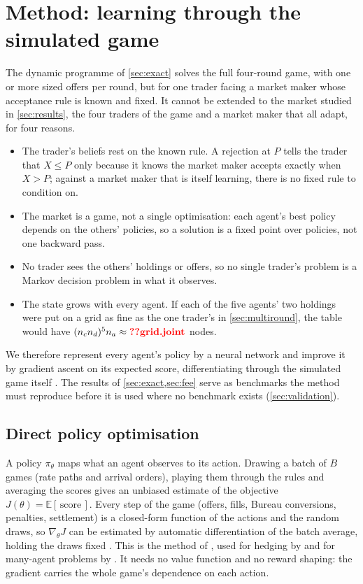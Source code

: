 \documentclass[11pt,a4paper]{article}
\makeatletter
\theoremstyle{plain}
\theoremstyle{definition}
\newcommand{\val}[1]{\ifcsname val@#1\endcsname\csname val@#1\endcsname\else
  \textcolor{red}{\textbf{??\detokenize{#1}}}\PackageWarning{paper}{Missing value #1}\fi}
\newcommand{\E}{\mathbb{E}}
\newcommand{\1}{\mathbf{1}}
\makeatother
\begin{document}
\section{Method: learning through the simulated game}\label{sec:method}
The dynamic programme of \cref{sec:exact} solves the full four-round game, with one or more sized offers per round, but for one trader facing a market maker whose acceptance rule is known and fixed. It cannot be extended to the market studied in \cref{sec:results}, the four traders of the game and a market maker that all adapt, for four reasons.
\begin{itemize}
\item The trader's beliefs rest on the known rule. A rejection at $P$ tells the trader that $X\le P$ only because it knows the market maker accepts exactly when $X>P$; against a market maker that is itself learning, there is no fixed rule to condition on.
\item The market is a game, not a single optimisation: each agent's best policy depends on the others' policies, so a solution is a fixed point over policies, not one backward pass.
\item No trader sees the others' holdings or offers, so no single trader's problem is a Markov decision problem in what it observes.
\item The state grows with every agent. If each of the five agents' two holdings were put on a grid as fine as the one trader's in \cref{sec:multiround}, the table would have $(n_c n_d)^5 n_a\approx\val{grid.joint}$ nodes.
\end{itemize} We therefore represent every agent's policy by a neural network and improve it by gradient ascent on its expected score, differentiating through the simulated game itself \citep{han2016,buehler2019}. The results of \cref{sec:exact,sec:fee} serve as benchmarks the method must reproduce before it is used where no benchmark exists (\cref{sec:validation}).

\subsection{Direct policy optimisation}\label{sec:direct}
A policy $\pi_\theta$ maps what an agent observes to its action. Drawing a batch of $B$ games (rate paths and arrival orders), playing them through the rules and averaging the scores gives an unbiased estimate of the objective $J(\theta)=\E[\,\text{score}\,]$. Every step of the game (offers, fills, Bureau conversions, penalties, settlement) is a closed-form function of the actions and the random draws, so $\nabla_\theta J$ can be estimated by automatic differentiation of the batch average, holding the draws fixed \citep{baydin2018}. This is the method of \citet{han2016}, used for hedging by \citet{buehler2019} and for many-agent problems by \citet{carmona2023}. It needs no value function and no reward shaping: the gradient carries the whole game's dependence on each action.
\end{document}
